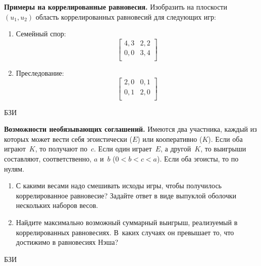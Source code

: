 \begin{problem}

{\bf Примеры на коррелированные равновесия.}
Изобразить на плоскости $(u_1,u_2)$ область коррелированных
равновесий для следующих игр:

\begin{enumerate}

\item Семейный спор:
\[\left[\begin{array}{ll}
4,3&2,2\\ 0,0&3,4\\
\end{array}\right]\]

\item Преследование:
\[\left[\begin{array}{ll}
2,0&0,1\\ 0,1&2,0\\
\end{array}\right]\]

\end{enumerate}




\begin{sol}

\end{sol}
\end{problem}


\begin{source}
БЗИ
\end{source}




\begin{problem}

{\bf Возможности необязывающих соглашений.} Имеются
два участника, каждый из которых может вести себя
эгоистически ($E$) или кооперативно ($K$). Если оба
играют~$K$, то получают по~$c$. Если один играет~$E$, а
другой~$K$, то выигрыши составляют, соответственно, $a$
и~$b$ (${0<b<c<a}$). Если оба эгоисты, то по нулям.

\begin{enumerate}

\item С какими весами надо смешивать исходы игры, чтобы
получилось коррелированное равновесие? Задайте ответ в виде
выпуклой оболочки нескольких наборов весов.

\item Найдите максимально возможный суммарный выигрыш,
реализуемый в коррелированных равновесиях. В~каких случаях
он превышает то, что достижимо в равновесиях Нэша?

\end{enumerate}



\begin{source}
БЗИ
\end{source}


\begin{sol}

\end{sol}
\end{problem}




